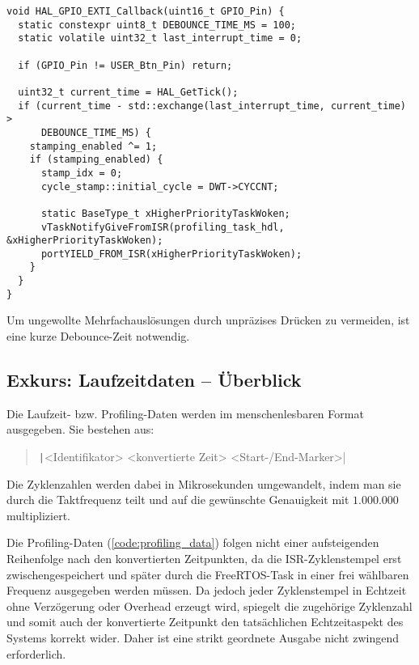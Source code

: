 \begin{code}
\begin{verbatim}
void HAL_GPIO_EXTI_Callback(uint16_t GPIO_Pin) {
  static constexpr uint8_t DEBOUNCE_TIME_MS = 100;
  static volatile uint32_t last_interrupt_time = 0;

  if (GPIO_Pin != USER_Btn_Pin) return;

  uint32_t current_time = HAL_GetTick();
  if (current_time - std::exchange(last_interrupt_time, current_time) >
      DEBOUNCE_TIME_MS) {
    stamping_enabled ^= 1;
    if (stamping_enabled) {
      stamp_idx = 0;
      cycle_stamp::initial_cycle = DWT->CYCCNT;

      static BaseType_t xHigherPriorityTaskWoken;
      vTaskNotifyGiveFromISR(profiling_task_hdl, &xHigherPriorityTaskWoken);
      portYIELD_FROM_ISR(xHigherPriorityTaskWoken);
    }
  }
}
\end{verbatim}
    \label{code:btn_irq}
\end{code}

Um ungewollte Mehrfachauslösungen durch unpräzises Drücken zu vermeiden, ist
eine kurze Debounce-Zeit notwendig.

\subsection{Exkurs: Laufzeitdaten -- Überblick}

Die Laufzeit- bzw. Profiling-Daten werden im menschenlesbaren Format ausgegeben.
Sie bestehen aus:

\begin{quote}
    \texttt|<Identifikator> <konvertierte Zeit> <Start-/End-Marker>|
\end{quote}

Die Zyklenzahlen werden dabei in Mikrosekunden umgewandelt, indem man sie durch
die Taktfrequenz teilt und auf die gewünschte Genauigkeit mit $1.000.000$
multipliziert.

Die Profiling-Daten (\ref{code:profiling_data}) folgen nicht einer aufsteigenden
Reihenfolge nach den konvertierten Zeitpunkten, da die ISR-Zyklenstempel erst
zwischengespeichert und später durch die FreeRTOS-Task in einer frei wählbaren
Frequenz ausgegeben werden müssen. Da jedoch jeder Zyklenstempel in Echtzeit
ohne Verzögerung oder Overhead erzeugt wird, spiegelt die zugehörige Zyklenzahl
und somit auch der konvertierte Zeitpunkt den tatsächlichen Echtzeitaspekt des
Systems korrekt wider. Daher ist eine strikt geordnete Ausgabe nicht zwingend
erforderlich.

